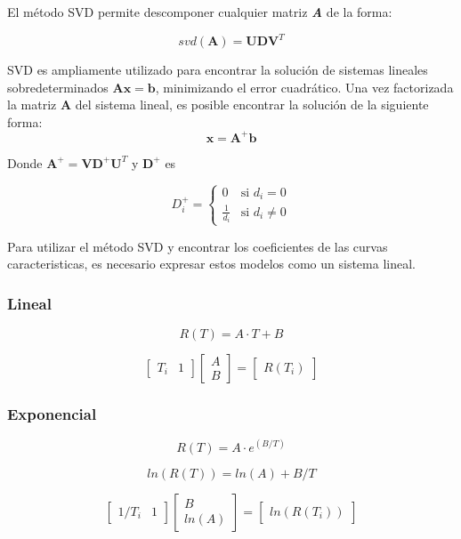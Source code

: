 \documentclass[conference]{IEEEtran}
\begin{document}
El m\'etodo SVD permite descomponer cualquier matriz \textbf{\textit{A}} de la forma:


\[
	svd(\mathbf{A}) = \mathbf{U} \mathbf{D} \mathbf{V}^T
\]

SVD es ampliamente utilizado para encontrar la solución de sistemas lineales sobredeterminados \( \mathbf{A}\mathbf{x} = \mathbf{b} \), minimizando el error cuadrático.
Una vez factorizada la matriz $\mathbf{A}$ del sistema lineal, es posible encontrar la soluci\'on de la siguiente forma:
\[
\mathbf{x} = \mathbf{A}^+ \mathbf{b}
\]


Donde $\mathbf{A}^{+} = \mathbf{V}\mathbf{D}^+ \mathbf{U}^T$ y $\mathbf{D}^+$ es 

\[
D_i^+ = 
\begin{cases}
	0 & \text{si } d_i = 0 \\
	\frac{1}{d_i} & \text{si } d_i \ne 0
\end{cases}
\]

Para utilizar el m\'etodo SVD y encontrar los coeficientes de las curvas caracteristicas, es necesario expresar estos modelos como un sistema lineal.


\subsubsection{Lineal}

\[
	R(T) = A \cdot T + B
\]

\[
	\begin{bmatrix} 
		T_{i} & 1 
	\end{bmatrix}
	\begin{bmatrix} 
		A \\ 
		B
	\end{bmatrix}
	= 
	\begin{bmatrix} 
		R(T_{i})
	\end{bmatrix}
\]


\subsubsection{Exponencial}
\[
	R(T) = A \cdot e^{(B/T)}
\]

\[
	ln(R(T)) = ln(A) + B/T
\]

\[
	\begin{bmatrix} 
		1/T_i & 1
	\end{bmatrix}
	\begin{bmatrix} 
		B \\
		ln(A)
	\end{bmatrix}
	=
	\begin{bmatrix} 
		ln(R(T_i))
	\end{bmatrix}
\]
\end{document}
